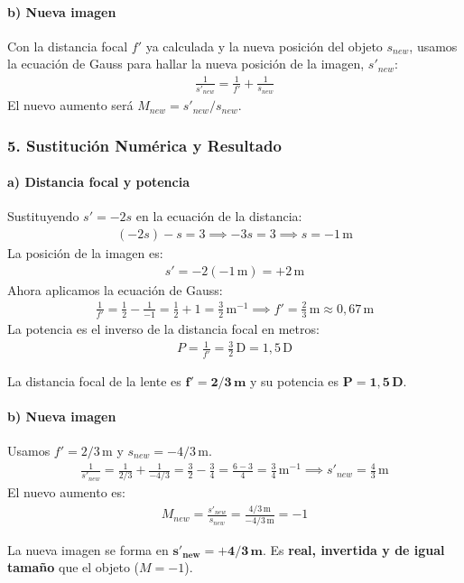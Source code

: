\paragraph*{b) Nueva imagen}
Con la distancia focal $f'$ ya calculada y la nueva posición del objeto $s_{new}$, usamos la ecuación de Gauss para hallar la nueva posición de la imagen, $s'_{new}$:
\begin{gather}
    \frac{1}{s'_{new}} = \frac{1}{f'} + \frac{1}{s_{new}}
\end{gather}
El nuevo aumento será $M_{new} = s'_{new} / s_{new}$.

\subsubsection*{5. Sustitución Numérica y Resultado}
\paragraph*{a) Distancia focal y potencia}
Sustituyendo $s'=-2s$ en la ecuación de la distancia:
\begin{gather}
    (-2s) - s = 3 \implies -3s = 3 \implies s = -1\,\text{m}
\end{gather}
La posición de la imagen es:
\begin{gather}
    s' = -2(-1\,\text{m}) = +2\,\text{m}
\end{gather}
Ahora aplicamos la ecuación de Gauss:
\begin{gather}
    \frac{1}{f'} = \frac{1}{2} - \frac{1}{-1} = \frac{1}{2} + 1 = \frac{3}{2}\,\text{m}^{-1} \implies f' = \frac{2}{3}\,\text{m} \approx 0,67\,\text{m}
\end{gather}
La potencia es el inverso de la distancia focal en metros:
\begin{gather}
    P = \frac{1}{f'} = \frac{3}{2}\,\text{D} = 1,5\,\text{D}
\end{gather}
\begin{cajaresultado}
La distancia focal de la lente es $\boldsymbol{f' = 2/3\,\textbf{m}}$ y su potencia es $\boldsymbol{P=1,5\,\textbf{D}}$.
\end{cajaresultado}

\paragraph*{b) Nueva imagen}
Usamos $f'=2/3\,\text{m}$ y $s_{new}=-4/3\,\text{m}$.
\begin{gather}
    \frac{1}{s'_{new}} = \frac{1}{2/3} + \frac{1}{-4/3} = \frac{3}{2} - \frac{3}{4} = \frac{6-3}{4} = \frac{3}{4}\,\text{m}^{-1} \implies s'_{new} = \frac{4}{3}\,\text{m}
\end{gather}
El nuevo aumento es:
\begin{gather}
    M_{new} = \frac{s'_{new}}{s_{new}} = \frac{4/3\,\text{m}}{-4/3\,\text{m}} = -1
\end{gather}
\begin{cajaresultado}
La nueva imagen se forma en $\boldsymbol{s'_{new}=+4/3\,\textbf{m}}$. Es \textbf{real, invertida y de igual tamaño} que el objeto ($M=-1$).
\end{cajaresultado}

